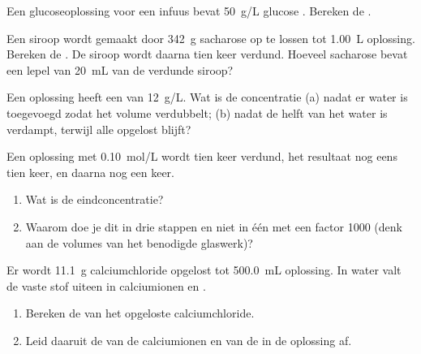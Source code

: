 \begin{exercise}[$\star\star$]\label{exo:g10:concentration-and-dilution:9}
Een glucoseoplossing voor een infuus bevat \qty{50}{g/L} glucose
. Bereken de .
\end{exercise}

\begin{exercise}[$\star\star$]\label{exo:g10:concentration-and-dilution:10}
Een siroop wordt gemaakt door \qty{342}{g} sacharose  op
te lossen tot \qty{1.00}{L} oplossing. Bereken de .
De siroop wordt daarna tien keer verdund. Hoeveel sacharose bevat een
lepel van \qty{20}{mL} van de verdunde siroop?
\end{exercise}

\begin{exercise}[$\star\star$]\label{exo:g10:concentration-and-dilution:11}
Een oplossing heeft een  van \qty{12}{g/L}. Wat is de
concentratie (a) nadat er water is toegevoegd zodat het volume
verdubbelt; (b) nadat de helft van het water is verdampt, terwijl alle
 opgelost blijft?
\end{exercise}

\begin{exercise}[$\star\star\star$]\label{exo:g10:concentration-and-dilution:12}
Een oplossing met \qty{0.10}{mol/L} wordt tien keer verdund, het
resultaat nog eens tien keer, en daarna nog een keer.
\begin{enumerate}
  \item Wat is de eindconcentratie?
  \item Waarom doe je dit in drie stappen en niet in één  met
        een factor 1000 (denk aan de volumes van het benodigde glaswerk)?
\end{enumerate}
\end{exercise}

\begin{exercise}[$\star\star\star$]\label{exo:g10:concentration-and-dilution:13}
Er wordt \qty{11.1}{g} calciumchloride  opgelost tot
\qty{500.0}{mL} oplossing. In water valt de vaste stof uiteen in
calciumionen  en  .
\begin{enumerate}
  \item Bereken de  van het opgeloste
        calciumchloride.
  \item Leid daaruit de  van de calciumionen en van
        de  in de oplossing af.
\end{enumerate}
\end{exercise}

